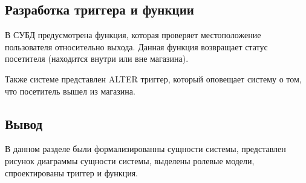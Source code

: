 \subsection{Разработка триггера и функции}

В СУБД предусмотрена функция, которая проверяет местоположение пользователя относительно выхода. 
Данная функция возвращает статус посетителя (находится внутри или вне магазина).

Также системе представлен ALTER триггер, который оповещает систему о том, 
что посетитель вышел из магазина.


\subsection*{Вывод}

В данном разделе были формализированны сущности системы, представлен рисунок диаграммы сущности системы,
выделены ролевые модели, спроектированы триггер и функция.